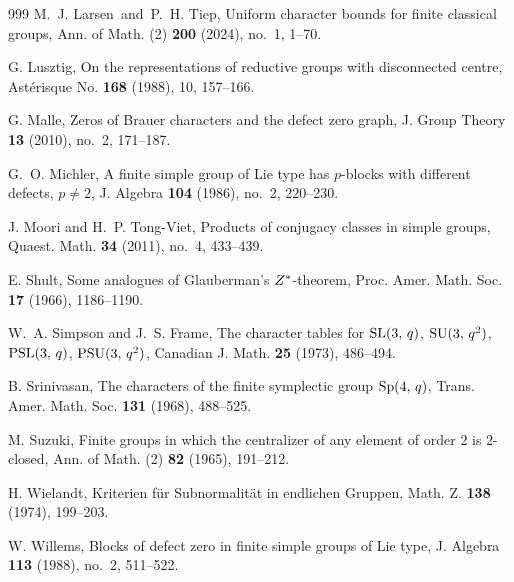 \documentclass[twoside,a4paper,reqno,12pt]{amsart}
\newcommand{\<}{\langle}
\renewcommand{\>}{\rangle}
\renewcommand{\:}{\colon}
\theoremstyle{definition}
\begin{document}
\begin{thebibliography}{999}
 M.~J. Larsen\ and\ P.~H. Tiep, Uniform character bounds for finite classical groups, Ann. of Math. (2) {\bf 200} (2024), no.~1, 1--70. 

 G. Lusztig, On the representations of reductive groups with disconnected centre, Ast\'erisque No. \textbf{168} (1988), 10, 157--166.

 G. Malle, Zeros of Brauer characters and the defect zero graph, J. Group Theory {\bf 13} (2010), no.~2, 171--187.

 G.~O. Michler, A finite simple group of Lie type has $p$-blocks with different defects, $p\not=2$, J. Algebra {\bf 104} (1986), no.~2, 220--230.

 J. Moori and H.~P. Tong-Viet, Products of conjugacy classes in simple groups, {Quaest. Math.} {\bf 34} (2011), no.~4, 433--439. 

 E. Shult, Some analogues of Glauberman's $Z\sp{\ast} $-theorem, {Proc. Amer. Math. Soc.} {\bf 17} (1966), 1186--1190.

 W.~A. Simpson and J.~S. Frame, The character tables for ${\rm SL}(3,\,q)$, ${\rm SU}(3,\,q\sp{2})$, ${\rm PSL}(3,\,q)$, ${\rm PSU}(3,\,q\sp{2})$, Canadian J. Math. {\bf 25} (1973), 486--494.

 B. Srinivasan, The characters of the finite symplectic group ${\rm Sp}(4,\,q)$, Trans. Amer. Math. Soc. {\bf 131} (1968), 488--525.


 M. Suzuki, Finite groups in which the centralizer of any element of order $2$ is $2$-closed, Ann. of Math. (2) {\bf 82} (1965), 191--212.


 H. Wielandt, Kriterien f\"{u}r Subnormalit\"{a}t in endlichen Gruppen, {Math. Z.} \textbf{ 138} (1974), 199--203.

 W. Willems, Blocks of defect zero in finite simple groups of Lie type, J. Algebra {\bf 113} (1988), no.~2, 511--522.


\end{thebibliography}
\end{document}

